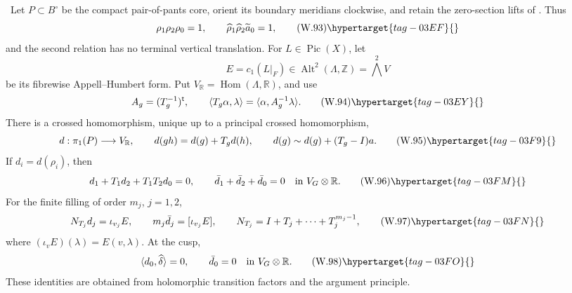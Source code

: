 \begin{proposition}
\hypertarget{tag-03IH}{}\label{wbII:prop:analytic-ah-boundary}

\ Let \(P\subset B^\circ\) be the compact pair-of-pants core,
orient its boundary meridians clockwise, and retain the zero-section lifts
of .  Thus
\[
 \rho_1\rho_2\rho_0=1,
 \qquad
 \widehat\rho_1\widehat\rho_2\widetilde a_0=1,
\tag{W.93}\hypertarget{tag-03EF}{}\label{wbII:eq:W:5.17-A1}
\]
and the second relation has no terminal vertical translation.  For
\(L\in\operatorname{Pic}(X)\), let
\[
 E=c_1(L|_F)\in\operatorname{Alt}^2(\Lambda,\mathbb Z)
   =\bigwedge^2V
\]
be its fibrewise Appell--Humbert form.  Put
\(V_{\mathbb R}=\operatorname{Hom}(\Lambda,\mathbb R)\), and use
\[
 A_g=(T_g^{-1})^{\mathsf t},
 \qquad
 \langle T_g\alpha,\lambda\rangle
 =\langle\alpha,A_g^{-1}\lambda\rangle.
\tag{W.94}\hypertarget{tag-03EY}{}\label{wbII:eq:W:5.17-A2}
\]
There is a crossed homomorphism, unique up to a principal crossed
homomorphism,
\[
 d:\pi_1(P)\longrightarrow V_{\mathbb R},
 \qquad
 d(gh)=d(g)+T_gd(h),
 \qquad
 d(g)\sim d(g)+(T_g-I)a.
\tag{W.95}\hypertarget{tag-03F9}{}\label{wbII:eq:W:5.17-A3}
\]
If \(d_i=d(\rho_i)\), then
\[
 d_1+T_1d_2+T_1T_2d_0=0,
 \qquad
 \bar d_1+\bar d_2+\bar d_0=0
 \quad\text{in }V_G\otimes\mathbb R.
\tag{W.96}\hypertarget{tag-03FM}{}\label{wbII:eq:W:5.17-A4}
\]
For the finite filling of order \(m_j\), \(j=1,2\),
\[
 N_{T_j}d_j=\iota_{v_j}E,
 \qquad
 m_j\bar d_j=[\iota_{v_j}E],
 \qquad
 N_{T_j}=I+T_j+\cdots+T_j^{m_j-1},
\tag{W.97}\hypertarget{tag-03FN}{}\label{wbII:eq:W:5.17-A5}
\]
where \((\iota_vE)(\lambda)=E(v,\lambda)\).  At the cusp,
\[
 \langle d_0,\widehat\delta\rangle=0,
 \qquad
 \bar d_0=0\quad\text{in }V_G\otimes\mathbb R.
\tag{W.98}\hypertarget{tag-03FO}{}\label{wbII:eq:W:5.17-A6}
\]
These identities are obtained from holomorphic transition factors and the
argument principle.
\end{proposition}



